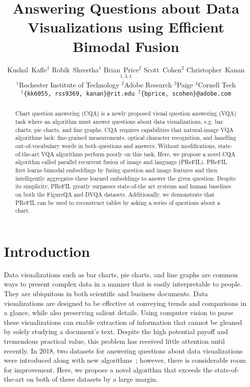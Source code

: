 \documentclass[10pt,twocolumn]{article}
\begin{document}
\title{Answering Questions about Data Visualizations using Efficient Bimodal Fusion}

\author{Kushal~Kafle$^1$ \qquad Robik~Shrestha$^1$ \qquad Brian~Price$^{2}$ \qquad Scott~Cohen$^{2}$ \qquad Christopher~Kanan$^{1,3,4}$\\ 
$^1$Rochester Institute of Technology \qquad $^2$Adobe Research \qquad $^3$Paige \qquad $^4$Cornell Tech\\
{\tt\small $^1$\{kk6055, rss9369, kanan\}@rit.edu \qquad  $^2$\{bprice, scohen\}@adobe.com}
}




\newcommand{\commentout}[1]{}

\maketitle

\begin{abstract}

Chart question answering (CQA) is a newly proposed visual question answering (VQA) task where an algorithm must answer questions about data visualizations, e.g. bar charts, pie charts, and line graphs. CQA requires capabilities that natural-image VQA algorithms lack: fine-grained measurements, optical character recognition, and handling out-of-vocabulary words in both questions and answers. Without modifications, state-of-the-art VQA algorithms perform poorly on this task. Here, we propose a novel CQA algorithm called parallel recurrent fusion of image and language (PReFIL). PReFIL first learns bimodal embeddings by fusing question and image features and then intelligently aggregates these learned embeddings to answer the given question. Despite its simplicity, PReFIL greatly surpasses state-of-the art systems and human baselines on both the FigureQA and DVQA datasets. Additionally, we demonstrate that PReFIL can be used to reconstruct tables by asking a series of questions about a chart.
\end{abstract}

\section{Introduction}

Data visualizations such as bar charts, pie charts, and line graphs are common ways to present complex data in a manner that is easily interpretable to people. They are ubiquitous in both scientific and business documents. Data visualizations are designed to be effective at conveying trends and comparisons in a glance, while also preserving salient details. Using computer vision to parse these visualizations can enable extraction of information that cannot be gleaned by solely studying a document's text. Despite the high potential payoff and tremendous practical value, this problem has received little attention until recently. In 2018, two datasets for answering questions about data visualizations were introduced along with new algorithms~\cite{kafle2018dvqa,figureqa}; however, there is considerable room for improvement. Here, we propose a novel algorithm that exceeds the state-of-the-art on both of these datasets by a large margin.
\end{document}
